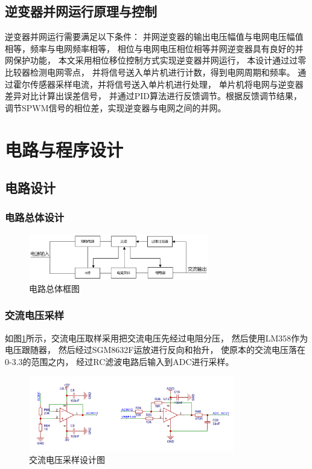 \documentclass[a4paper,12pt]{article}
\begin{document}
\subsection{逆变器并网运行原理与控制}
逆变器并网运行需要满足以下条件：
并网逆变器的输出电压幅值与电网电压幅值相等，频率与电网频率相等，
相位与电网电压相位相等并网逆变器具有良好的并网保护功能，
本文采用相位移位控制方式实现逆变器并网运行，
本设计通过过零比较器检测电网零点，
并将信号送入单片机进行计数，得到电网周期和频率。
通过霍尔传感器采样电流，并将信号送入单片机进行处理，
单片机将电网与逆变器差异对比计算出误差信号，
并通过PID算法进行反馈调节。根据反馈调节结果，
调节SPWM信号的相位差，实现逆变器与电网之间的并网。


\section{电路与程序设计}
\subsection{电路设计}

\subsubsection{电路总体设计}
\begin{figure}[h]
\centering
\includegraphics[width=0.7\textwidth]{src/fig4.png}
\caption{电路总体框图}
\end{figure}

\subsubsection{交流电压采样}
如图\ref{fig5}所示，交流电压取样采用把交流电压先经过电阻分压，
然后使用LM358作为电压跟随器，
然后经过SGM8632F运放进行反向和抬升，
使原本的交流电压落在0-3.3的范围之内，
经过RC滤波电路后输入到ADC进行采样。
\begin{figure}[h]
\centering
\includegraphics[width=0.8\textwidth]{src/fig5.png}
\caption{交流电压采样设计图}
\label{fig5}
\end{figure}
\end{document}
